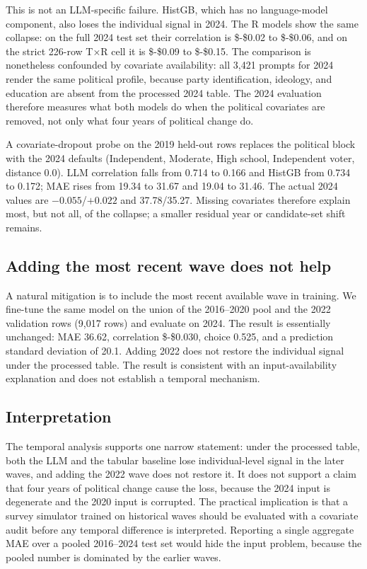 This is not an LLM-specific failure. HistGB, which has no language-model
component, also loses the individual signal in 2024. The R models show
the same collapse: on the full 2024 test set their correlation is
\$-\$0.02 to \$-\$0.06, and on the strict 226-row T×R cell it is
\$-\$0.09 to \$-\$0.15. The comparison is nonetheless confounded by
covariate availability: all 3,421 prompts for 2024 render the same
political profile, because party identification, ideology, and education
are absent from the processed 2024 table. The 2024 evaluation therefore
measures what both models do when the political covariates are removed,
not only what four years of political change do.

A covariate-dropout probe on the 2019 held-out rows replaces the
political block with the 2024 defaults (Independent, Moderate, High
school, Independent voter, distance 0.0). LLM correlation falls from
0.714 to 0.166 and HistGB from 0.734 to 0.172; MAE rises from 19.34 to
31.67 and 19.04 to 31.46. The actual 2024 values are
\(-0.055\)/\(+0.022\) and 37.78/35.27. Missing covariates therefore
explain most, but not all, of the collapse; a smaller residual year or
candidate-set shift remains.

\subsection{Adding the most recent wave does not
help}\label{adding-the-most-recent-wave-does-not-help}

A natural mitigation is to include the most recent available wave in
training. We fine-tune the same model on the union of the 2016--2020
pool and the 2022 validation rows (9,017 rows) and evaluate on 2024. The
result is essentially unchanged: MAE 36.62, correlation \$-\$0.030,
choice 0.525, and a prediction standard deviation of 20.1. Adding 2022
does not restore the individual signal under the processed table. The
result is consistent with an input-availability explanation and does not
establish a temporal mechanism.

\subsection{Interpretation}\label{interpretation}

The temporal analysis supports one narrow statement: under the processed
table, both the LLM and the tabular baseline lose individual-level
signal in the later waves, and adding the 2022 wave does not restore it.
It does not support a claim that four years of political change cause
the loss, because the 2024 input is degenerate and the 2020 input is
corrupted. The practical implication is that a survey simulator trained
on historical waves should be evaluated with a covariate audit before
any temporal difference is interpreted. Reporting a single aggregate MAE
over a pooled 2016--2024 test set would hide the input problem, because
the pooled number is dominated by the earlier waves.

